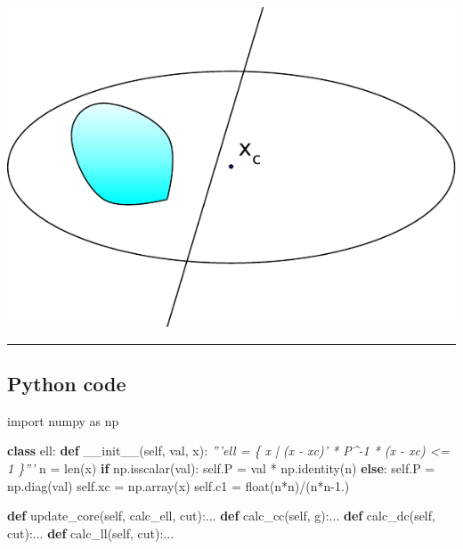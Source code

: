 \documentclass[]{article}
\newenvironment{Shaded}{}{}
\newcommand{\BuiltInTok}[1]{#1}
\newcommand{\CommentTok}[1]{\textcolor[rgb]{0.38,0.63,0.69}{\textit{#1}}}
\newcommand{\ControlFlowTok}[1]{\textcolor[rgb]{0.00,0.44,0.13}{\textbf{#1}}}
\newcommand{\FloatTok}[1]{\textcolor[rgb]{0.25,0.63,0.44}{#1}}
\newcommand{\FunctionTok}[1]{\textcolor[rgb]{0.02,0.16,0.49}{#1}}
\newcommand{\ImportTok}[1]{#1}
\newcommand{\KeywordTok}[1]{\textcolor[rgb]{0.00,0.44,0.13}{\textbf{#1}}}
\newcommand{\NormalTok}[1]{#1}
\newcommand{\OperatorTok}[1]{\textcolor[rgb]{0.40,0.40,0.40}{#1}}
\newcommand{\VariableTok}[1]{\textcolor[rgb]{0.10,0.09,0.49}{#1}}
\begin{document}
\includegraphics{ellipsoid.files/ellipsoid.pdf}

\begin{center}\rule{0.5\linewidth}{\linethickness}\end{center}

\hypertarget{python-code-3}{%
\subsection{Python code}\label{python-code-3}}

\begin{Shaded}
\begin{Highlighting}[]
\ImportTok{import}\NormalTok{ numpy }\ImportTok{as}\NormalTok{ np}

\KeywordTok{class}\NormalTok{ ell:}
    \KeywordTok{def} \FunctionTok{__init__}\NormalTok{(}\VariableTok{self}\NormalTok{, val, x):}
        \CommentTok{'''ell = \{ x | (x - xc)' * P^-1 * (x - xc) <= 1 \}'''}
\NormalTok{        n }\OperatorTok{=} \BuiltInTok{len}\NormalTok{(x)}
        \ControlFlowTok{if}\NormalTok{ np.isscalar(val):}
            \VariableTok{self}\NormalTok{.P }\OperatorTok{=}\NormalTok{ val }\OperatorTok{*}\NormalTok{ np.identity(n)}
        \ControlFlowTok{else}\NormalTok{:}
            \VariableTok{self}\NormalTok{.P }\OperatorTok{=}\NormalTok{ np.diag(val)}
        \VariableTok{self}\NormalTok{.xc }\OperatorTok{=}\NormalTok{ np.array(x)}
        \VariableTok{self}\NormalTok{.c1 }\OperatorTok{=} \BuiltInTok{float}\NormalTok{(n}\OperatorTok{*}\NormalTok{n)}\OperatorTok{/}\NormalTok{(n}\OperatorTok{*}\NormalTok{n}\FloatTok{-1.}\NormalTok{)}

    \KeywordTok{def}\NormalTok{ update_core(}\VariableTok{self}\NormalTok{, calc_ell, cut):...}
    \KeywordTok{def}\NormalTok{ calc_cc(}\VariableTok{self}\NormalTok{, g):...}
    \KeywordTok{def}\NormalTok{ calc_dc(}\VariableTok{self}\NormalTok{, cut):...}
    \KeywordTok{def}\NormalTok{ calc_ll(}\VariableTok{self}\NormalTok{, cut):...}
\end{Highlighting}
\end{Shaded}
\end{document}
